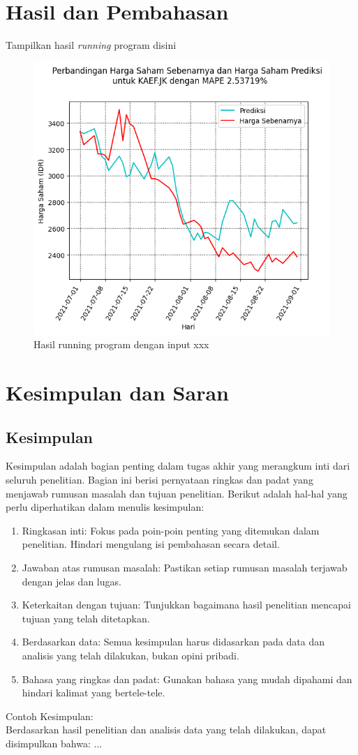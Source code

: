 \documentclass[english,12pt,a4paper]{book}
\begin{document}
\chapter{Hasil dan Pembahasan}
Tampilkan hasil \textit{running} program disini
\begin{figure}
	\centering
	\includegraphics[width=\linewidth]{KAEF}
	\caption{Hasil running program dengan input xxx}
	\label{fig:kaef}
\end{figure}

\chapter{Kesimpulan dan Saran}
\section{Kesimpulan}
Kesimpulan adalah bagian penting dalam tugas akhir yang merangkum inti dari seluruh penelitian. Bagian ini berisi pernyataan ringkas dan padat yang menjawab rumusan masalah dan tujuan penelitian. Berikut adalah hal-hal yang perlu diperhatikan dalam menulis kesimpulan:
\begin{enumerate}
	\item Ringkasan inti: Fokus pada poin-poin penting yang ditemukan dalam penelitian. Hindari mengulang isi pembahasan secara detail.
	\item Jawaban atas rumusan masalah: Pastikan setiap rumusan masalah terjawab dengan jelas dan lugas.
	\item Keterkaitan dengan tujuan: Tunjukkan bagaimana hasil penelitian mencapai tujuan yang telah ditetapkan.
	\item Berdasarkan data: Semua kesimpulan harus didasarkan pada data dan analisis yang telah dilakukan, bukan opini pribadi.
	\item Bahasa yang ringkas dan padat: Gunakan bahasa yang mudah dipahami dan hindari kalimat yang bertele-tele.
\end{enumerate}
Contoh Kesimpulan:\\
Berdasarkan hasil penelitian dan analisis data yang telah dilakukan, dapat disimpulkan bahwa: ...
\end{document}
